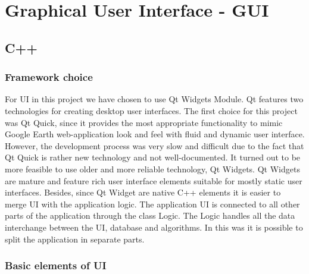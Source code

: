 
\chapter{Graphical User Interface - GUI} %

\label{Chapter7} %


\section{C++}
\subsection{Framework choice}

For UI in this project we have chosen to use Qt Widgets Module. Qt features two technologies for creating desktop user interfaces. The first choice for this project was Qt Quick, since it provides the most appropriate functionality to mimic Google Earth web-application look and feel with fluid and dynamic user interface. However, the development process was very slow and difficult due to the fact that Qt Quick is rather new technology and not well-documented. It turned out to be more feasible to use older and more reliable technology, Qt Widgets. Qt Widgets are mature and feature rich user interface elements suitable for mostly static user interfaces. Besides, since Qt Widget are native C++ elements it is easier to merge UI with the application logic.
The application UI is connected to all other parts of the application through the class Logic.  The Logic handles all the data interchange between the UI, database and algorithms. In this was it is possible to split the application in separate parts. 

\subsection{Basic elements of UI}

